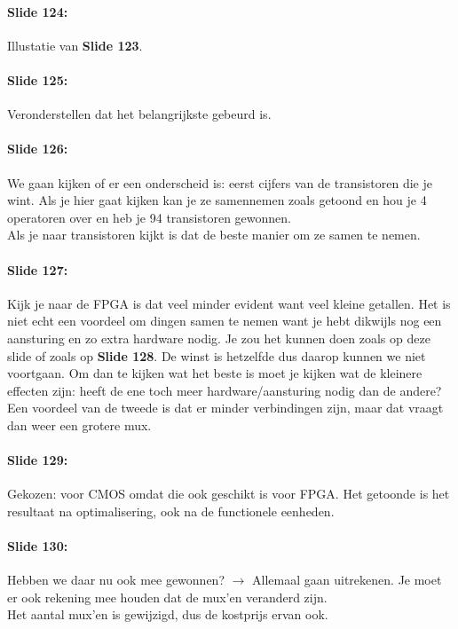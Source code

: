 \documentclass[10pt,a4paper]{book}
\begin{document}
\paragraph{Slide 124:} Illustatie van \textbf{Slide 123}.

\paragraph{Slide 125:} Veronderstellen dat het belangrijkste gebeurd is.

\paragraph{Slide 126:} We gaan kijken of er een onderscheid is: eerst cijfers van de transistoren die je wint. Als je hier gaat kijken kan je ze samennemen zoals getoond en hou je 4 operatoren over en heb je 94 transistoren gewonnen.\\
Als je naar transistoren kijkt is dat de beste manier om ze samen te nemen.

\paragraph{Slide 127:} Kijk je naar de FPGA is dat veel minder evident want veel kleine getallen. Het is niet echt een voordeel om dingen samen te nemen want je hebt dikwijls nog een aansturing en zo extra hardware nodig. Je zou het kunnen doen zoals op deze slide of zoals op \textbf{Slide 128}. De winst is hetzelfde dus daarop kunnen we niet voortgaan. Om dan te kijken wat het beste is moet je kijken wat de kleinere effecten zijn: heeft de ene toch meer hardware/aansturing nodig dan de andere? Een voordeel van de tweede is dat er minder verbindingen zijn, maar dat vraagt dan weer een grotere mux.

\paragraph{Slide 129:} Gekozen: voor CMOS omdat die ook geschikt is voor FPGA. Het getoonde is het resultaat na optimalisering, ook na de functionele eenheden.

\paragraph{Slide 130:} Hebben we daar nu ook mee gewonnen? $\rightarrow$ Allemaal gaan uitrekenen. Je moet er ook rekening mee houden dat de mux'en veranderd zijn.\\
Het aantal mux'en is gewijzigd, dus de kostprijs ervan ook. 
\end{document}
